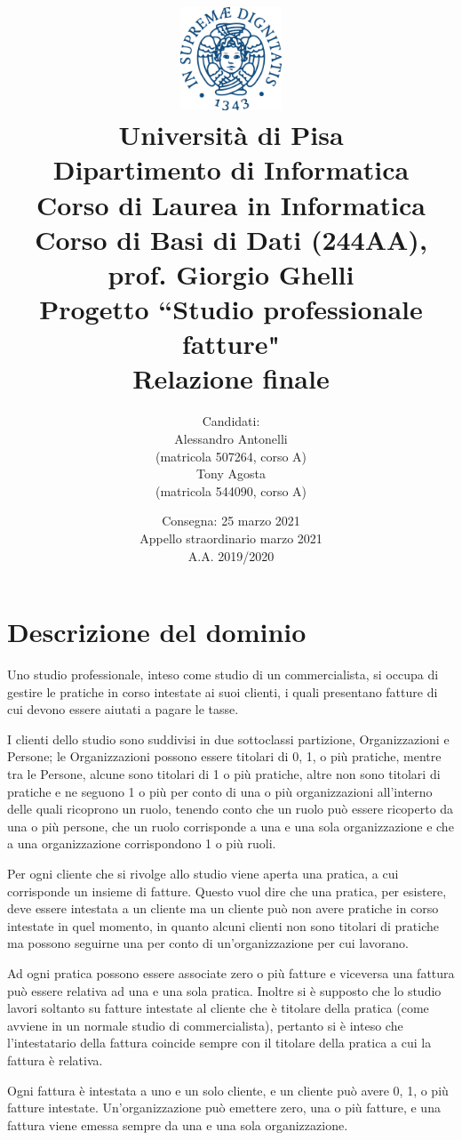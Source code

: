 \documentclass[a4paper,12pt]{article}
\title { \centering\includegraphics[width=3cm]{ Stemma_unipi.png }\\{\small Università di Pisa\\Dipartimento di Informatica\\Corso di Laurea in Informatica\\[1cm]Corso di Basi di Dati (244AA), prof. Giorgio Ghelli\\[1.5cm]}Progetto ``Studio professionale fatture"\\Relazione finale\vspace{1cm} }
\author { \vspace{0.2cm}Candidati:\\Alessandro Antonelli\\\vspace{0.3cm}(matricola 507264, corso A)\\Tony Agosta\\(matricola 544090, corso A)}
\date { \vspace{1cm}Consegna: 25 marzo 2021\\Appello straordinario marzo 2021\\A.A. 2019/2020 }
\begin{document}
 \maketitle

 \clearpage
 
 \tableofcontents

\listoffigures

\lstlistoflistings

 \clearpage
 

 \section{ Descrizione del dominio }

Uno studio professionale, inteso come studio di un commercialista, si occupa di gestire le pratiche in corso intestate ai suoi clienti, i quali presentano fatture di cui devono essere aiutati a pagare le tasse.

I clienti dello studio sono suddivisi in due sottoclassi partizione, Organizzazioni e Persone; le Organizzazioni possono essere titolari di 0, 1, o più pratiche, mentre tra le Persone, alcune sono titolari di 1 o più pratiche, altre non sono titolari di pratiche e ne seguono 1 o più per conto di una o più organizzazioni all’interno delle quali ricoprono un ruolo, tenendo conto che un ruolo può essere ricoperto da una o più persone, che un ruolo corrisponde a una e una sola organizzazione e che a una organizzazione corrispondono 1 o più ruoli.

Per ogni cliente che si rivolge allo studio viene aperta una pratica, a cui corrisponde un insieme di fatture. Questo vuol dire che una pratica, per esistere, deve essere intestata a un cliente ma un cliente può non avere pratiche in corso intestate in quel momento, in quanto alcuni clienti non sono titolari di pratiche ma possono seguirne una per conto di un’organizzazione per cui lavorano.

Ad ogni pratica possono essere associate zero o più fatture e viceversa una fattura può essere relativa ad una e una sola pratica. Inoltre si è supposto che lo studio lavori soltanto su fatture intestate al cliente che è titolare della pratica (come avviene in un normale studio di commercialista), pertanto si è inteso che l'intestatario della fattura coincide sempre con il titolare della pratica a cui la fattura è relativa.

Ogni fattura è intestata a uno e un solo cliente, e un cliente può avere 0, 1, o più fatture intestate. Un’organizzazione può emettere zero, una o più fatture, e una fattura viene emessa sempre da una e una sola organizzazione.
\end{document}
